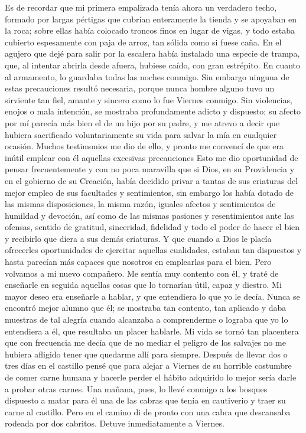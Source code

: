 \documentclass{novela}
\begin{document}
    Es de recordar que mi primera empalizada tenía ahora un verdadero techo, formado por largas pértigas que cubrían enteramente la tienda y se apoyaban en la roca; sobre ellas había colocado troncos finos en lugar de vigas, y todo estaba cubierto espesamente con paja de arroz, tan sólida como si fuese caña. En el agujero que dejé para salir por la escalera había instalado una especie de trampa, que, al intentar abrirla desde afuera, hubiese caído, con gran estrépito. En cuanto al armamento, lo guardaba todas las noches conmigo.
    Sin embargo ninguna de estas precauciones resultó necesaria, porque nunca hombre alguno tuvo un sirviente tan fiel, amante y sincero como lo fue Viernes conmigo. Sin violencias, enojos o mala intención, se mostraba profundamente adicto y dispuesto; su afecto por mí parecía más bien el de un hijo por su padre, y me atrevo a decir que hubiera sacrificado voluntariamente su vida para salvar la mía en cualquier ocasión. Muchos testimonios me dio de ello, y pronto me convencí de que era inútil emplear con él aquellas excesivas precauciones
    Esto me dio oportunidad de pensar frecuentemente y con no poca maravilla que si Dios, en su Providencia y en el gobierno de su Creación, había decidido privar a tantas de sus criaturas del mejor empleo de sus facultades y sentimientos, sin embargo los había dotado de las mismas disposiciones, la misma razón, iguales afectos y sentimientos de humildad y devoción, así como de las mismas pasiones y resentimientos ante las ofensas, sentido de gratitud, sinceridad, fidelidad y todo el poder de hacer el bien y recibirlo que diera a sus demás criaturas. Y que cuando a Dios le placía ofrecerles oportunidades de ejercitar aquellas cualidades, estaban tan dispuestos y hasta parecían más capaces que nosotros en emplearlas para el bien.
    Pero volvamos a mi nuevo compañero. Me sentía muy contento con él, y traté de enseñarle en seguida aquellas cosas que lo tornarían útil, capaz y diestro. Mi mayor deseo era enseñarle a hablar, y que entendiera lo que yo le decía. Nunca se encontró mejor alumno que él; se mostraba tan contento, tan aplicado y daba muestras de tal alegría cuando alcanzaba a comprenderme o lograba que yo lo entendiera a él, que resultaba un placer hablarle. Mi vida se tornó tan placentera que con frecuencia me decía que de no mediar el peligro de los salvajes no me hubiera afligido tener que quedarme allí para siempre.
    Después de llevar dos o tres días en el castillo pensé que para alejar a Viernes de su horrible costumbre de comer carne humana y hacerle perder el hábito adquirido lo mejor sería darle a probar otras carnes. Una mañana, pues, lo llevé conmigo a los bosques dispuesto a matar para él una de las cabras que tenía en cautiverio y traer su carne al castillo. Pero en el camino di de pronto con una cabra que descansaba rodeada por dos cabritos. Detuve inmediatamente a Viernes.
\end{document}
